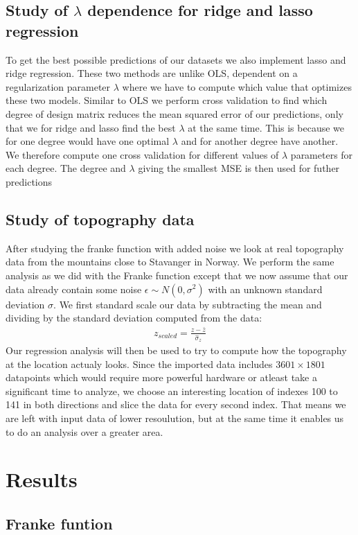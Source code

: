 \documentclass[12pt]{article}
\begin{document}
\subsection{Study of $\lambda$ dependence for ridge and lasso regression}
To get the best possible predictions of our datasets we also implement lasso and ridge regression. These two methods are unlike OLS, dependent on a regularization parameter $\lambda$ where we have to compute which value that optimizes these two models. Similar to OLS we perform cross validation to find which degree of design matrix reduces the mean squared error of our predictions, only that we for ridge and lasso find the best $\lambda$ at the same time. This is because we for one degree would have one optimal $\lambda$ and for another degree have another. We therefore compute one cross validation for different values of $\lambda$ parameters for each degree. The degree and $\lambda$ giving the smallest MSE is then used for futher predictions

\subsection{Study of topography data}
After studying the franke function with added noise we look at real topography data from the mountains close to Stavanger in Norway. We perform the same analysis as we did with the Franke function except that we now assume that our data already contain some noise $\epsilon \sim N(0, \sigma^2)$ with an unknown standard deviation $\sigma$. We first standard scale our data by subtracting the mean and dividing by the standard deviation computed from the data:
\begin{align*}
  z_{scaled} = \frac{z-\bar{z}}{\hat{\sigma}_z}
\end{align*}
Our regression analysis will then be used to try to compute how the topography at the location actualy looks. Since the imported data includes  $3601 \times1801$ datapoints which would require more powerful hardware or atleast take a significant time to analyze, we choose an interesting location of indexes 100 to 141 in both directions and slice the data for every second index. That means we are left with input data of lower resoulution, but at the same time it enables us to do an analysis over a greater area.
\section{Results}
\subsection{Franke funtion}
\end{document}
